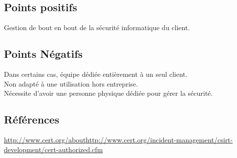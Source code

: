 \subsection{Points positifs}
Gestion de bout en bout de la sécurité informatique du client.

\subsection{Points Négatifs}
Dans certains cas, équipe dédiée entièrement à un seul client.\\
Non adapté à une utilisation hors entreprise.\\
Nécessite d’avoir une personne physique dédiée pour gérer la sécurité.\\

\subsection{Références}
\small
\noindent
[1][2] \url{http://www.cert.org/about}\newline
[3][4] \url{http://www.cert.org/incident-management/csirt-development/cert-authorized.cfm}\newline
\normalsize